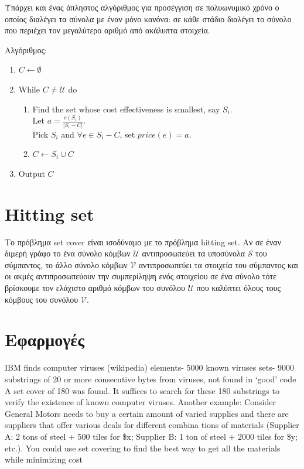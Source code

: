 Υπάρχει και ένας άπληστος αλγόριθμος για προσέγγιση σε πολυωνυμικό χρόνο ο οποίος διαλέγει τα σύνολα με έναν μόνο κανόνα: σε κάθε στάδιο διαλέγει το σύνολο που περιέχει τον μεγαλύτερο αριθμό από ακάλυπτα στοιχεία.

Αλγόριθμος:
\begin{enumerate}
\item $ C \leftarrow \emptyset$
\item While $ C \neq {\mathcal{U}} $ do
\begin{enumerate}
\item Find the set whose cost effectiveness is smallest, say $S_i$. \\
			Let $a = \frac{c(S_i)}{|S_i-C|}$. \\
			Pick $S_i$ and $\forall e \in{S_i - C}$, set $price(e) = a$.
\item $C \leftarrow S_i \cup C$
\end{enumerate}
\item Output $C$
\end{enumerate}

\section{Hitting set}
Το πρόβλημα set cover είναι ισοδύναμο με το πρόβλημα hitting set. Αν σε έναν διμερή γράφο το ένα σύνολο κόμβων ${\mathcal{U}}$ αντιπροσωπεύει τα υποσύνολα ${\mathcal{S}}$ του σύμπαντος, το άλλο σύνολο κόμβων ${\mathcal{V}}$ αντιπροσωπεύει τα στοιχεία του σύμπαντος και οι ακμές αντιπροσωπεύουν την συμπερίληψη ενός στοιχείου σε ένα σύνολο τότε βρίσκουμε τον ελάχιστο αριθμό κόμβων του συνόλου ${\mathcal{U}}$ που καλύπτει όλους τους κόμβους του συνόλου ${\mathcal{V}}$.

\section{Εφαρμογές}
IBM finds computer viruses (wikipedia) 
elements- 5000 known viruses 
sets- 9000 substrings of 20 or more consecutive bytes from viruses, not found in ‘good’ code 
A set cover of 180 was found.  It suffices to search 
for these 180 substrings to verify the existence of 
known computer viruses. 
Another example:  Consider General Motors needs to 
buy a certain amount of varied supplies and there are 
suppliers that offer various deals for different combina
tions of materials (Supplier A: 2 tons of steel + 500 tiles 
for \$x; Supplier B: 1 ton of steel + 2000 tiles for \$y; etc.).  You could use set covering to find the best way to 
get all the materials while minimizing cost
